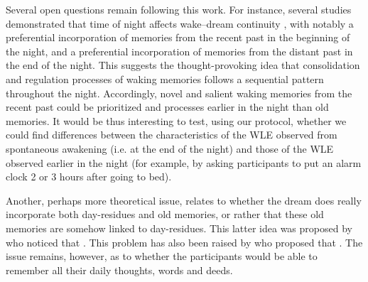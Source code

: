 Several open questions remain following this work. For instance, several studies demonstrated that time of night affects wake–dream continuity \citep{roffwarg_effects_1978, malinowski_effect_2014}, with notably a preferential incorporation of memories from the recent past in the beginning of the night, and a preferential incorporation of memories from the distant past in the end of the night. This suggests the thought-provoking idea that consolidation and regulation processes of waking memories follows a sequential pattern throughout the night. Accordingly, novel and salient waking memories from the recent past could be prioritized and processes earlier in the night than old memories. It would be thus interesting to test, using our protocol, whether we could find differences between the characteristics of the WLE observed from spontaneous awakening (i.e. at the end of the night) and those of the WLE observed earlier in the night (for example, by asking participants to put an alarm clock 2 or 3 hours after going to bed).

Another, perhaps more theoretical issue, relates to whether the dream does really incorporate both day-residues and old memories, or rather that these old memories are somehow linked to day-residues. This latter idea was proposed by \citet{freud_interpretation_1900} who noticed that  \citep{marquardt_empirical_1996}. This problem has also been raised by \citet{grenier_temporal_2005} who proposed that . The issue remains, however, as to whether the participants would be able to remember all their daily thoughts, words and deeds.

